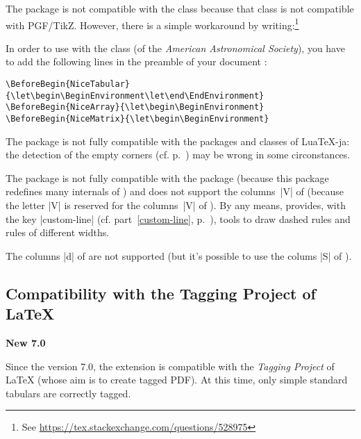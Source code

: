 \documentclass[dvipsnames]{article}%
\begin{document}
The package  is not compatible with the class 
because that class is not compatible with PGF/TikZ. However, there is a simple
workaround by writing:\footnote{See
 \url{https://tex.stackexchange.com/questions/528975}}\par\nobreak 




\medskip
In order to use  with the class 
(of the \emph{American Astronomical Society}), you have to
add the following lines in the preamble of your document :

\begin{Verbatim}
\end{Verbatim}


\medskip
The package  is not fully compatible with the packages and classes
of LuaTeX-ja: the detection of the empty corners (cf. p.~\pageref{corners})
may be wrong in some circonstances.

\medskip
The package  is not fully compatible with the package
 (because this package redefines many internals of )
and does not support the columns~|V| of  (because the letter |V| is
reserved for the columns~|V| of ). By any means, 
provides, with the key |custom-line| (cf. part~\ref{custom-line},
p.~\pageref{custom-line}), tools to draw dashed rules and rules of different
widths. 

\bigskip
The columns |d| of  are not supported (but it's possible to use
the colums |S| of ).


\subsection{Compatibility with the Tagging Project of LaTeX}

\label{Tagging Project}

\colorbox{yellow!50}{\bfseries New 7.0}

Since the version 7.0, the extension  is compatible with the
\emph{Tagging Project} of LaTeX (whose aim is to create tagged PDF). At this time, only
simple standard tabulars are correctly tagged.
\end{document}
